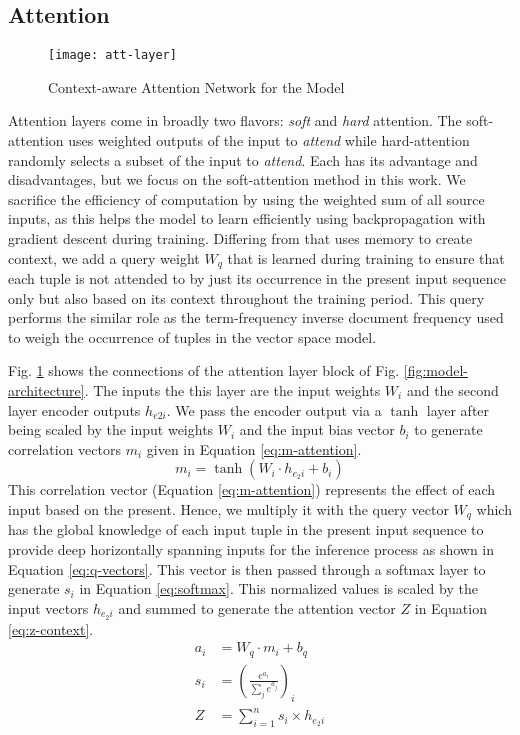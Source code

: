 \subsection{Attention}
\label{subsec:attention}
\begin{figure}[!t]
	\centering
	\texttt{[image: att-layer]}
	\caption{Context-aware Attention Network for the Model}
	\label{fig:att-layer}
\end{figure}
Attention layers come in broadly two flavors: \emph{soft} and \emph{hard} 
attention. The soft-attention uses weighted outputs of the input to 
\emph{attend} while hard-attention randomly selects a subset of the input to 
\emph{attend}. Each has its advantage and disadvantages, but we focus on the 
soft-attention method in this work. We sacrifice the efficiency of computation 
by using the weighted sum of all source inputs, as this helps the model to 
learn efficiently using backpropagation with gradient descent during training. 
Differing from \cite{salton2017attentive} that uses memory to create context, 
we add a query weight $W_q$ that is learned during training to ensure that each 
tuple is not attended to by just its occurrence in the present input sequence 
only but also based on its context throughout the training period. This query 
performs the similar role as the term-frequency inverse document frequency used 
to weigh the occurrence of tuples in the vector space model. \par
Fig. \ref{fig:att-layer} shows the connections of the attention layer 
block of Fig. \ref{fig:model-architecture}. The inputs the this layer are the 
input weights $W_i$ and the second layer encoder outputs $ h_{e2i} $. We pass 
the encoder output via a $\tanh$ layer after being scaled by the input weights 
$ W_i $ and the input bias vector $ b_i $ to generate correlation vectors $ 
m_i $ given in Equation \ref{eq:m-attention}.
\begin{equation}
\label{eq:m-attention}
	m_i = \tanh (W_{i} \cdot h_{e_2i} + b_i)
\end{equation}
This correlation vector (Equation \ref{eq:m-attention}) represents the effect 
of each input based on the present. Hence, we multiply it with the query vector 
$ W_q $ which has the global knowledge of each input tuple in the present 
input sequence to provide deep horizontally spanning inputs for the inference 
process as shown in Equation \ref{eq:q-vectors}. This vector is then passed 
through a softmax layer to generate $ s_i $ in Equation \ref{eq:softmax}. This 
normalized values is scaled by the input vectors $ h_{e_2i}$ and summed to 
generate the attention vector $ Z $ in Equation \ref{eq:z-context}.
\begin{align}
a_i &= W_{q} \cdot m_i + b_q \label{eq:q-vectors} \\
s_i &= \left( \frac{e^{a_i}}{\sum_j e^{a_j}}\right)_i \label{eq:softmax} \\
Z &= \sum_{i=1}^n s_i \times h_{e_2i} \label{eq:z-context}
\end{align}

